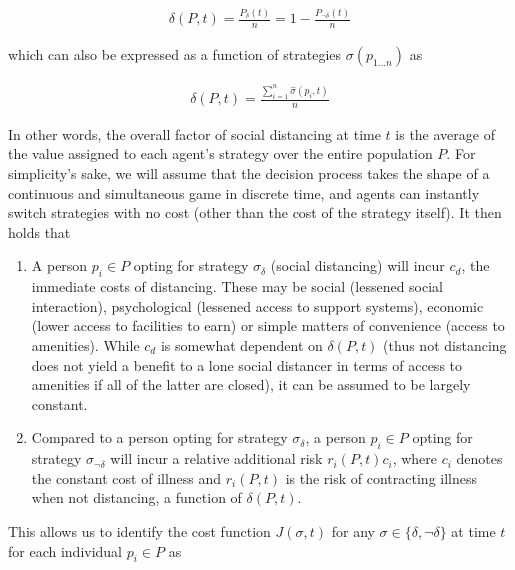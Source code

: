 \documentclass{article}
\begin{document}
\begin{equation}
	\begin{aligned}
		\delta(P, t) = \frac{P_{\delta}(t)}{n} = 1 - \frac{P_{\lnot \delta}(t)}{n}
	\end{aligned}
\end{equation}

\noindent which can also be expressed as a function of strategies $\sigma(p_{1 \ldots n})$ as

\begin{equation}
	\begin{aligned}
		\delta(P, t) = \frac{\sum_{i=1}^n \hat{\sigma}(p_i, t)}{n}
	\end{aligned}
	\label{eq:delta_value}
\end{equation}

In other words, the overall factor of social distancing at time $t$ is the average of the value assigned to each agent's strategy over the entire population $P$. For simplicity's sake, we will assume that the decision process takes the shape of a continuous and simultaneous game in discrete time, and agents can instantly switch strategies with no cost (other than the cost of the strategy itself). It then holds that

\begin{enumerate}
	\item A person $p_i \in P$ opting for strategy $\sigma_{\delta}$ (social distancing) will incur $c_d$, the immediate costs of distancing. These may be social (lessened social interaction), psychological (lessened access to support systems), economic (lower access to facilities to earn) or simple matters of convenience (access to amenities). While $c_d$ is somewhat dependent on $\delta(P, t)$ (thus not distancing does not yield a benefit to a lone social distancer in terms of access to amenities if all of the latter are closed), it can be assumed to be largely constant.
	\item Compared to a person opting for strategy $\sigma_{\delta}$, a person $p_i \in P$ opting for strategy $\sigma_{\lnot \delta}$ will incur a relative additional risk $r_i(P, t) c_i$, where $c_i$ denotes the constant cost of illness and $r_i(P, t)$ is the risk of contracting illness when not distancing, a function of $\delta(P, t)$.
\end{enumerate}

This allows us to identify the cost function $J(\sigma, t)$ for any $\sigma \in \{\delta, \lnot \delta\}$ at time $t$ for each individual $p_i \in P$ as
\end{document}
